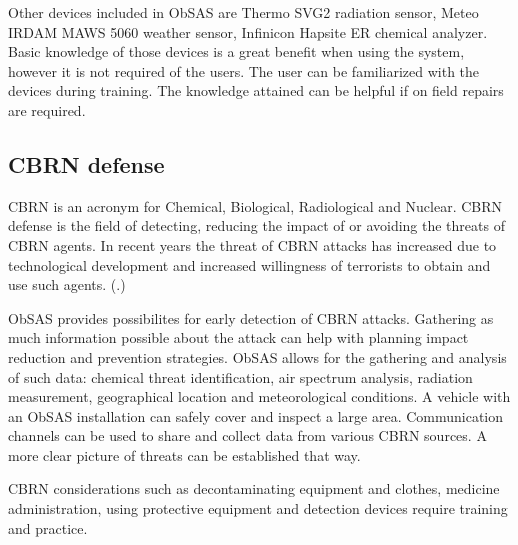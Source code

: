 \documentclass[12pt, a4paper,oneside, nocenter]{thesis}
\renewcommand{\citep}[1]{(\citealp{#1}.)}
\begin{document}
\par
Other devices included in ObSAS are Thermo SVG2 radiation sensor, Meteo IRDAM MAWS 5060 weather sensor, Infinicon Hapsite ER chemical analyzer. Basic knowledge of those devices is a great benefit when using the system, however it is not required of the users. The user can be familiarized with the devices during training. The knowledge attained can be helpful if on field repairs are required.
\par
\subsection{CBRN defense}
CBRN is an acronym for Chemical, Biological, Radiological and Nuclear. CBRN defense is the field of detecting, reducing the impact of or avoiding the threats of CBRN agents. In recent years the threat of CBRN attacks has increased due to technological development and increased willingness of terrorists to obtain and use such agents. \citep{crowd-behavior}
\par
ObSAS provides possibilites for early detection of CBRN attacks. Gathering as much information possible about the attack can help with planning impact reduction and prevention strategies. ObSAS allows for the gathering and analysis of such data: chemical threat identification, air spectrum analysis, radiation measurement, geographical location and meteorological conditions. A vehicle with an ObSAS installation can safely cover and inspect a large area. Communication channels can be used to share and collect data from various CBRN sources. A more clear picture of threats can be established that way.\par
CBRN considerations such as decontaminating equipment and clothes, medicine administration, using protective equipment and detection devices require training and practice.
\end{document}
